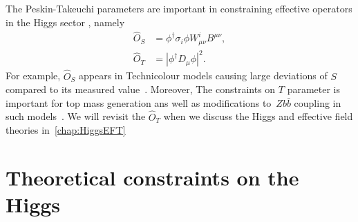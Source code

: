 The Peskin-Takeuchi parameters are important in constraining effective operators in the Higgs sector , namely
 \begin{align}
 \hat{O}_S &= \phi^\dagger \sigma_i \phi W^i_{\mu \nu} B^{\mu \nu}, \nonumber \\
\hat{O}_T &= |\phi^\dagger D_\mu \phi|^2.
\end{align}
For example, $\hat{O}_S$ appears in Technicolour models causing large deviations of $S$ compared to its measured value~\cite{GOLDEN19913,HOLDOM199088,ALTARELLI19923,PhysRevLett.65.964}. Moreover, The constraints on $T$ parameter is important for top mass generation ans well as modifications to~$Z  b \bar{b}$ coupling in such models~\cite{PhysRevLett.69.575,Simmons:1995df}. We will revisit the $\hat{O}_T$ when we discuss the Higgs and effective field theories in~\autoref{chap:HiggsEFT}
\section{Theoretical constraints on the Higgs \label{sec:theoreticalconst}}
